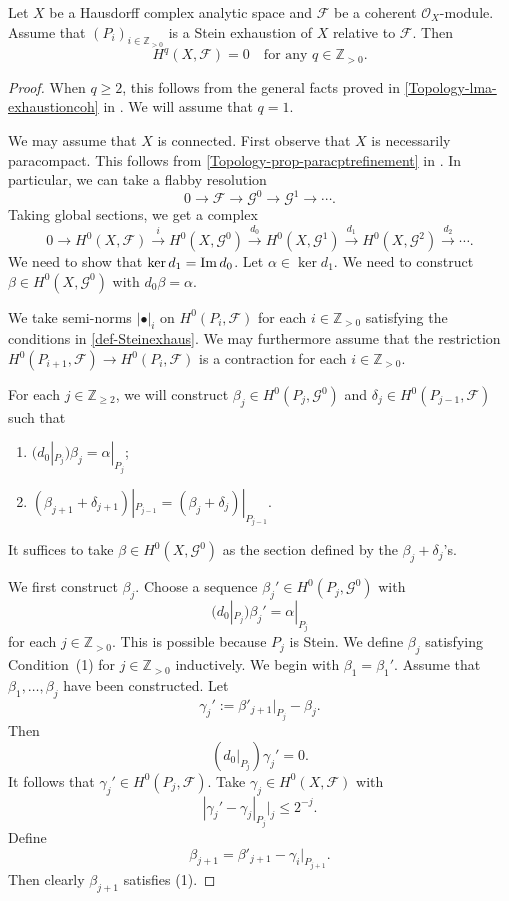 \begin{thm}
    Let $X$ be a Hausdorff complex analytic space and $\mathcal{F}$ be a coherent $\mathcal{O}_X$-module. Assume that $(P_i)_{i\in \mathbb{Z}_{>0}}$ is a Stein exhaustion of $X$ relative to $\mathcal{F}$. Then
    \[
        H^q(X,\mathcal{F})=0\quad \text{for any }q\in \mathbb{Z}_{>0}.  
    \]
\end{thm}
\begin{proof}
    When $q\geq 2$, this follows from the general facts proved in \cref{Topology-lma-exhaustioncoh} in . We will assume that $q=1$.

    We may assume that $X$ is connected.
    First observe that $X$ is necessarily paracompact. This follows from \cref{Topology-prop-paracptrefinement} in . In particular, we can take a flabby resolution
    \[
        0\rightarrow \mathcal{F}\rightarrow \mathcal{G}^0\rightarrow \mathcal{G}^1\rightarrow \cdots.  
    \]
    Taking global sections, we get a complex
    \[
        0\rightarrow H^0(X,\mathcal{F})\xrightarrow{i} H^0(X,\mathcal{G}^0)\xrightarrow{d_0} H^0(X,\mathcal{G}^1)\xrightarrow{d_1}H^0(X,\mathcal{G}^2)\xrightarrow{d_2} \cdots.  
    \]
    We need to show that $\ker d_1=\operatorname{Im} d_0$. Let $\alpha\in \ker d_1$. We need to construct $\beta\in H^0(X,\mathcal{G}^0)$ with $d_0 \beta=\alpha$.

    We take semi-norms $|\bullet|_i$ on $H^0(P_i,\mathcal{F})$ for each $i\in \mathbb{Z}_{>0}$ satisfying the conditions in \cref{def-Steinexhaus}. We may furthermore assume that the restriction $H^0(P_{i+1},\mathcal{F})\rightarrow H^0(P_i,\mathcal{F})$ is a contraction for each $i\in \mathbb{Z}_{>0}$.

    For each $j\in \mathbb{Z}_{\geq 2}$, we will construct $\beta_j\in H^0(P_j,\mathcal{G}^0)$ and $\delta_j\in H^0(P_{j-1},\mathcal{F})$ such that
    \begin{enumerate}
        \item $(d_0|_{P_j})\beta_j=\alpha|_{P_j}$;
        \item $(\beta_{j+1}+\delta_{j+1})|_{P_{j-1}}=(\beta_{j}+\delta_{j})|_{P_{j-1}}$.
    \end{enumerate}
    It suffices to take $\beta\in H^0(X,\mathcal{G}^0)$ as the section defined by the $\beta_j+\delta_j$'s.

    We first construct $\beta_j$. Choose a sequence $\beta_j'\in H^0(P_j,\mathcal{G}^0)$ with 
    \[
        (d_0|_{P_j})\beta_j'=\alpha|_{P_j}  
    \]
    for each $j\in \mathbb{Z}_{>0}$. This is possible because $P_j$ is Stein. We define $\beta_j$ satisfying Condition~(1) for $j\in \mathbb{Z}_{>0}$ inductively. We begin with $\beta_1=\beta_1'$. Assume that $\beta_1,\ldots,\beta_j$ have been constructed. Let
    \[
        \gamma_j':=\beta'_{j+1}|_{P_j}-\beta_j. 
    \]
    Then
    \[
        (d_0|_{P_j})\gamma_j'=0.        
    \]
     It follows that $\gamma_j'\in H^0(P_j,\mathcal{F})$. Take $\gamma_j\in H^0(X,\mathcal{F})$ with 
    \[
        |\gamma_j'-\gamma_j|_{P_j}|_j\leq 2^{-j}.  
    \]
    Define
    \[
        \beta_{j+1}=\beta'_{j+1}-\gamma_i|_{P_{j+1}}. 
    \]
    Then clearly $\beta_{j+1}$ satisfies (1).


\end{proof}
